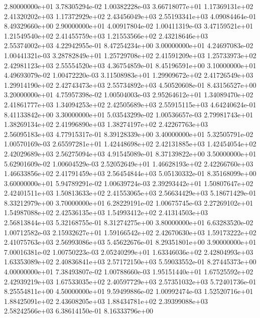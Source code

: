 \documentclass{article}
\begin{document}
\begin{center}
{   2.80000000e+01   3.78305294e-02   1.00382228e-03   3.66718077e+01   1.17369131e+02   2.41320202e+03   1.17372929e+02   2.43456049e+03   2.55193341e+03   4.09084464e-01   8.49329660e+00
   2.90000000e+01   4.00917804e-02   1.00411319e-03   3.47159521e+01   1.21549540e+02   2.41455759e+03   1.21553566e+02   2.43218646e+03   2.55374002e+03   4.22942955e-01   8.47254234e+00
   3.00000000e+01   4.24697083e-02   1.00441321e-03   3.28782849e+01   1.25729708e+02   2.41591209e+03   1.25733973e+02   2.42981123e+03   2.55554520e+03   4.36754859e-01   8.45196591e+00
   3.10000000e+01   4.49693079e-02   1.00472220e-03   3.11508983e+01   1.29909672e+02   2.41726549e+03   1.29914190e+02   2.42743473e+03   2.55734892e+03   4.50520608e-01   8.43156527e+00
   3.20000000e+01   4.75957398e-02   1.00504003e-03   2.95264612e+01   1.34089470e+02   2.41861777e+03   1.34094253e+02   2.42505689e+03   2.55915115e+03   4.64240624e-01   8.41133842e+00
   3.30000000e+01   5.03543299e-02   1.00536657e-03   2.79981743e+01   1.38269134e+02   2.41996890e+03   1.38274197e+02   2.42267763e+03   2.56095183e+03   4.77915317e-01   8.39128339e+00
   3.40000000e+01   5.32505791e-02   1.00570169e-03   2.65597281e+01   1.42448698e+02   2.42131885e+03   1.42454054e+02   2.42029689e+03   2.56275094e+03   4.91545089e-01   8.37139822e+00
   3.50000000e+01   5.62901609e-02   1.00604529e-03   2.52052649e+01   1.46628193e+02   2.42266760e+03   1.46633856e+02   2.41791459e+03   2.56454844e+03   5.05130332e-01   8.35168099e+00
   3.60000000e+01   5.94789291e-02   1.00639724e-03   2.39293442e+01   1.50807647e+02   2.42401511e+03   1.50813633e+02   2.41553065e+03   2.56634429e+03   5.18671429e-01   8.33212979e+00
   3.70000000e+01   6.28229191e-02   1.00675745e-03   2.27269102e+01   1.54987088e+02   2.42536135e+03   1.54993412e+02   2.41314503e+03   2.56813844e+03   5.32168755e-01   8.31274275e+00
   3.80000000e+01   6.63283520e-02   1.00712582e-03   2.15932627e+01   1.59166542e+02   2.42670630e+03   1.59173222e+02   2.41075763e+03   2.56993086e+03   5.45622676e-01   8.29351801e+00
   3.90000000e+01   7.00016381e-02   1.00750223e-03   2.05240299e+01   1.63346036e+02   2.42804993e+03   1.63353089e+02   2.40836841e+03   2.57172150e+03   5.59033552e-01   8.27445373e+00
   4.00000000e+01   7.38493807e-02   1.00788660e-03   1.95151440e+01   1.67525592e+02   2.42939219e+03   1.67533035e+02   2.40597729e+03   2.57351032e+03   5.72401736e-01   8.25554811e+00
   4.50000000e+01   9.59499886e-02   1.00992474e-03   1.52520716e+01   1.88425091e+02   2.43608205e+03   1.88434781e+02   2.39399088e+03   2.58242566e+03   6.38614150e-01   8.16333796e+00
}
\end{center}
\end{document}
